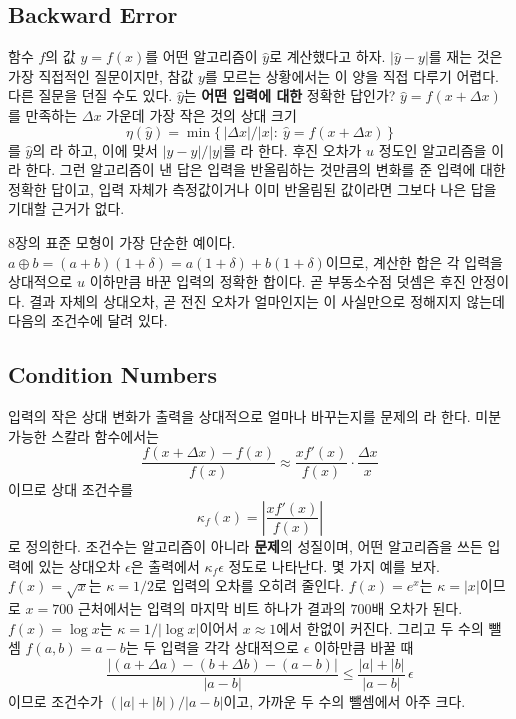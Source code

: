 \subsection{Backward Error}

함수 $f$의 값 $y=f(x)$를 어떤 알고리즘이 $\hat y$로 계산했다고 하자. $|\hat y-y|$를 재는 것은 가장 직접적인 질문이지만, 참값 $y$를 모르는 상황에서는 이 양을 직접 다루기 어렵다. 다른 질문을 던질 수도 있다. $\hat y$는 \textbf{어떤 입력에 대한} 정확한 답인가? $\hat y=f(x+\Delta x)$를 만족하는 $\Delta x$ 가운데 가장 작은 것의 상대 크기
\[
\eta(\hat y)=\min\bigl\{\,|\Delta x|/|x|:\ \hat y=f(x+\Delta x)\,\bigr\}
\]
를 $\hat y$의 라 하고, 이에 맞서 $|\hat y-y|/|y|$를 라 한다. 후진 오차가 $u$ 정도인 알고리즘을 이라 한다. 그런 알고리즘이 낸 답은 입력을 반올림하는 것만큼의 변화를 준 입력에 대한 정확한 답이고, 입력 자체가 측정값이거나 이미 반올림된 값이라면 그보다 나은 답을 기대할 근거가 없다.

8장의 표준 모형이 가장 단순한 예이다. $a\oplus b=(a+b)(1+\delta)=a(1+\delta)+b(1+\delta)$이므로, 계산한 합은 각 입력을 상대적으로 $u$ 이하만큼 바꾼 입력의 정확한 합이다. 곧 부동소수점 덧셈은 후진 안정이다. 결과 자체의 상대오차, 곧 전진 오차가 얼마인지는 이 사실만으로 정해지지 않는데 다음의 조건수에 달려 있다.

\subsection{Condition Numbers}

입력의 작은 상대 변화가 출력을 상대적으로 얼마나 바꾸는지를 문제의 라 한다. 미분 가능한 스칼라 함수에서는
\[
\frac{f(x+\Delta x)-f(x)}{f(x)}\approx\frac{xf'(x)}{f(x)}\cdot\frac{\Delta x}x
\]
이므로 상대 조건수를
\begin{equation}
\label{eq:cond-scalar}
\kappa_f(x)=\left|\frac{xf'(x)}{f(x)}\right|
\end{equation}
로 정의한다. 조건수는 알고리즘이 아니라 \textbf{문제}의 성질이며, 어떤 알고리즘을 쓰든 입력에 있는 상대오차 $\epsilon$은 출력에서 $\kappa_f\epsilon$ 정도로 나타난다. 몇 가지 예를 보자. $f(x)=\sqrt x$는 $\kappa=1/2$로 입력의 오차를 오히려 줄인다. $f(x)=e^x$는 $\kappa=|x|$이므로 $x=700$ 근처에서는 입력의 마지막 비트 하나가 결과의 $700$배 오차가 된다. $f(x)=\log x$는 $\kappa=1/|\log x|$이어서 $x\approx1$에서 한없이 커진다. 그리고 두 수의 뺄셈 $f(a,b)=a-b$는 두 입력을 각각 상대적으로 $\epsilon$ 이하만큼 바꿀 때
\begin{equation}
\label{eq:cond-sub}
\frac{|(a+\Delta a)-(b+\Delta b)-(a-b)|}{|a-b|}\le\frac{|a|+|b|}{|a-b|}\,\epsilon
\end{equation}
이므로 조건수가 $(|a|+|b|)/|a-b|$이고, 가까운 두 수의 뺄셈에서 아주 크다.

